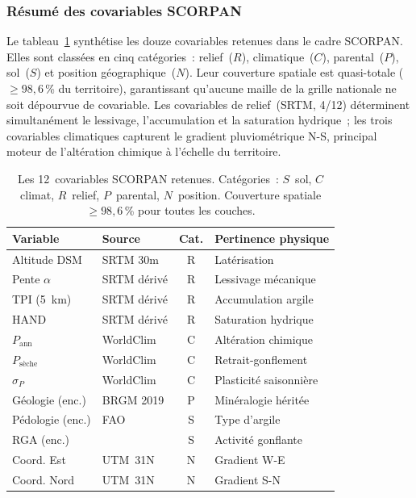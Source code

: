 \documentclass[10pt,a4paper,twocolumn]{article}
\begin{document}
	\subsubsection{Résumé des covariables SCORPAN}

	Le tableau~\ref{tab:covariables} synthétise les douze covariables
	retenues dans le cadre SCORPAN. Elles sont classées en cinq
	catégories~: relief~($R$), climatique~($C$), parental~($P$),
	sol~($S$) et position géographique~($N$).
	Leur couverture spatiale est quasi-totale
	(${}\geq98{,}6$\,\% du territoire), garantissant qu'aucune maille
	de la grille nationale ne soit dépourvue de covariable.
	Les covariables de relief~(SRTM, 4/12) déterminent
	simultanément le lessivage, l'accumulation et la saturation
	hydrique~; les trois covariables climatiques capturent
	le gradient pluviométrique N-S, principal moteur de l'altération
	chimique à l'échelle du territoire.

	\begin{table}[htbp]
		\centering\small
		\caption{Les 12~covariables SCORPAN retenues.
			Catégories~: $S$~sol, $C$~climat, $R$~relief, $P$~parental,
			$N$~position.
			Couverture spatiale~$\geq98{,}6$\,\% pour toutes les couches.}
		\label{tab:covariables}
		\setlength{\tabcolsep}{3pt}
		\begin{tabular}{@{}p{2.0cm}p{1.6cm}cp{2.1cm}@{}}
			\toprule
			Variable & Source & Cat. & Pertinence physique \\
			\midrule
			Altitude DSM         & SRTM 30m    & R & Latérisation \\
			Pente $\alpha$       & SRTM dérivé & R & Lessivage mécanique \\
			TPI (5~km)           & SRTM dérivé & R & Accumulation argile \\
			HAND                 & SRTM dérivé & R & Saturation hydrique \\
			$P_{\mathrm{ann}}$   & WorldClim   & C & Altération chimique \\
			$P_{\mathrm{sèche}}$ & WorldClim   & C & Retrait-gonflement \\
			$\sigma_P$           & WorldClim   & C & Plasticité saisonnière \\
			Géologie (enc.)      & BRGM 2019   & P & Minéralogie héritée \\
			Pédologie (enc.)     & FAO         & S & Type d'argile \\
			RGA (enc.)           & \cite{chassagneux1996} & S & Activité gonflante \\
			Coord. Est           & UTM~31N     & N & Gradient W-E \\
			Coord. Nord          & UTM~31N     & N & Gradient S-N \\
			\bottomrule
		\end{tabular}
	\end{table}
	
\end{document}

